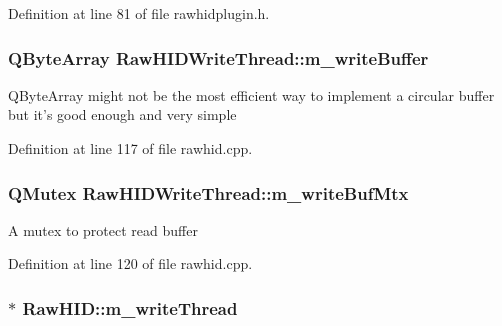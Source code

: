 \-Definition at line 81 of file rawhidplugin.\-h.

\hypertarget{group___raw_h_i_d_plugin_ga4b0316d5c6599d45686fc5066a246e7e}{
\subsubsection[{m\-\_\-write\-Buffer}]{\setlength{\rightskip}{0pt plus 5cm}\-Q\-Byte\-Array {\bf \-Raw\-H\-I\-D\-Write\-Thread\-::m\-\_\-write\-Buffer}}}\label{group___raw_h_i_d_plugin_ga4b0316d5c6599d45686fc5066a246e7e}
\-Q\-Byte\-Array might not be the most efficient way to implement a circular buffer but it's good enough and very simple 

\-Definition at line 117 of file rawhid.\-cpp.

\hypertarget{group___raw_h_i_d_plugin_gaa53a045dd368b7ad82ac5853679019e0}{
\subsubsection[{m\-\_\-write\-Buf\-Mtx}]{\setlength{\rightskip}{0pt plus 5cm}\-Q\-Mutex {\bf \-Raw\-H\-I\-D\-Write\-Thread\-::m\-\_\-write\-Buf\-Mtx}}}\label{group___raw_h_i_d_plugin_gaa53a045dd368b7ad82ac5853679019e0}
\-A mutex to protect read buffer 

\-Definition at line 120 of file rawhid.\-cpp.

\hypertarget{group___raw_h_i_d_plugin_ga103f382a48fee4b9fe034b3d88f45d42}{
\subsubsection[{m\-\_\-write\-Thread}]{$\ast$ {\bf \-Raw\-H\-I\-D\-::m\-\_\-write\-Thread}}}\label{group___raw_h_i_d_plugin_ga103f382a48fee4b9fe034b3d88f45d42}


